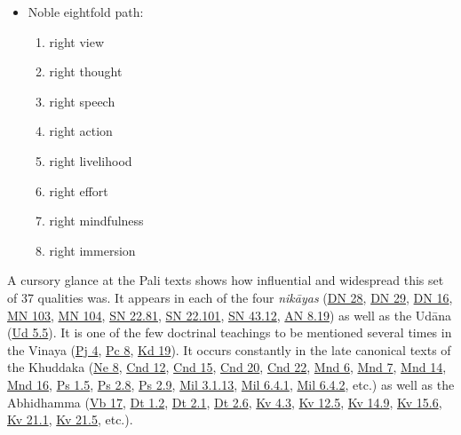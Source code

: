 \documentclass[12pt,openany]{book}%
\begin{document}
\begin{itemize}
%
\item Noble eightfold path:
\begin{enumerate}%
\item right view%
\item right thought%
\item right speech%
\item right action%
\item right livelihood%
\item right effort%
\item right mindfulness%
\item right immersion%
\end{enumerate}

%
\end{itemize}

A cursory glance at the Pali texts shows how influential and widespread this set of 37 qualities was. It appears in each of the four \textit{\textsanskrit{nikāyas}} (\href{https://suttacentral.net/dn28}{DN 28}, \href{https://suttacentral.net/dn29}{DN 29}, \href{https://suttacentral.net/dn16}{DN 16}, \href{https://suttacentral.net/mn103}{MN 103}, \href{https://suttacentral.net/mn104}{MN 104}, \href{https://suttacentral.net/sn22.81}{SN 22.81}, \href{https://suttacentral.net/sn22.101}{SN 22.101}, \href{https://suttacentral.net/sn43.12}{SN 43.12}, \href{https://suttacentral.net/an8.19}{AN 8.19}) as well as the \textsanskrit{Udāna} (\href{https://suttacentral.net/ud5.5}{Ud 5.5}). It is one of the few doctrinal teachings to be mentioned several times in the Vinaya (\href{https://suttacentral.net/pj4}{Pj 4}, \href{https://suttacentral.net/pc8}{Pc 8}, \href{https://suttacentral.net/pli{-}tv{-}kd19}{Kd 19}). It occurs constantly in the late canonical texts of the Khuddaka (\href{https://suttacentral.net/ne8}{Ne 8}, \href{https://suttacentral.net/cnd12}{Cnd 12}, \href{https://suttacentral.net/cnd15}{Cnd 15}, \href{https://suttacentral.net/cnd20}{Cnd 20}, \href{https://suttacentral.net/cnd22}{Cnd 22}, \href{https://suttacentral.net/mnd6}{Mnd 6}, \href{https://suttacentral.net/mnd7}{Mnd 7}, \href{https://suttacentral.net/mnd14}{Mnd 14}, \href{https://suttacentral.net/mnd16}{Mnd 16}, \href{https://suttacentral.net/ps1.5}{Ps 1.5}, \href{https://suttacentral.net/ps2.8}{Ps 2.8}, \href{https://suttacentral.net/ps2.9}{Ps 2.9}, \href{https://suttacentral.net/mil3.1.13}{Mil 3.1.13}, \href{https://suttacentral.net/mil6.4.1}{Mil 6.4.1}, \href{https://suttacentral.net/mil6.4.2}{Mil 6.4.2}, etc.) as well as the Abhidhamma (\href{https://suttacentral.net/vb17}{Vb 17}, \href{https://suttacentral.net/Dt1.2}{Dt 1.2}, \href{https://suttacentral.net/Dt2.1}{Dt 2.1}, \href{https://suttacentral.net/Dt2.6}{Dt 2.6}, \href{https://suttacentral.net/kv4.3}{Kv 4.3}, \href{https://suttacentral.net/kv12.5}{Kv 12.5}, \href{https://suttacentral.net/kv14.9}{Kv 14.9}, \href{https://suttacentral.net/kv15.6}{Kv 15.6}, \href{https://suttacentral.net/kv21.1}{Kv 21.1}, \href{https://suttacentral.net/kv21.5}{Kv 21.5}, etc.).
\end{document}
